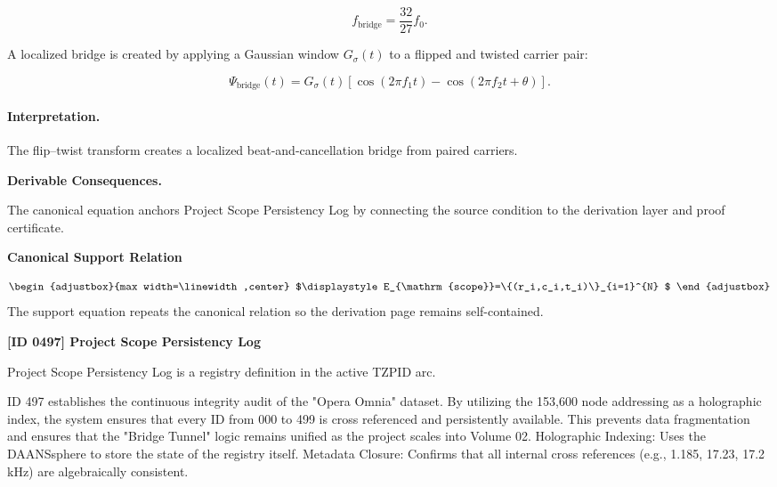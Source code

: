 \begin{equation}
f_{\mathrm{bridge}}=\frac{32}{27}f_0.
\end{equation}

A localized bridge is created by applying a Gaussian window $G_\sigma(t)$ to a flipped and twisted carrier pair:

\begin{equation}
\boxed{
\Psi_{\mathrm{bridge}}(t)
=
G_{\sigma}(t)
\left[
\cos(2\pi f_1t)
-
\cos(2\pi f_2t+\theta)
\right].
}
\end{equation}

\paragraph{Interpretation.}
The flip--twist transform creates a localized beat-and-cancellation bridge from paired carriers.

\par\vspace{0.35em}
\noindent\textbf{Derivable Consequences.}\quad
\begingroup
\footnotesize
\raggedright
The canonical equation anchors Project Scope Persistency Log by connecting the source condition to the derivation layer and proof certificate.
\par\endgroup

\noindent\textbf{Canonical Support Relation}\par
\[
\begin{adjustbox}{max width=\linewidth,center}
$\displaystyle
E_{\mathrm{scope}}=\{(r_i,c_i,t_i)\}_{i=1}^{N}
$
\end{adjustbox}
\]
\noindent The support equation repeats the canonical relation so the derivation page remains self-contained.\par

\clearpage
\noindent\textbf{[ID 0497] Project Scope Persistency Log}\par
\vspace{0.35em}
\begingroup\small
{}
Project Scope Persistency Log is a registry definition in the active TZPID arc.

ID 497 establishes the continuous integrity audit of the "Opera Omnia" dataset. By utilizing the 153,600 node addressing as a holographic index, the system ensures that every ID from 000 to 499 is cross referenced and persistently available. This prevents data fragmentation and ensures that the "Bridge Tunnel" logic remains unified as the project scales into Volume 02. Holographic Indexing: Uses the DAANSsphere to store the state of the registry itself. Metadata Closure: Confirms that all internal cross references (e.g., 1.185, 17.23, 17.2 kHz) are algebraically consistent.

